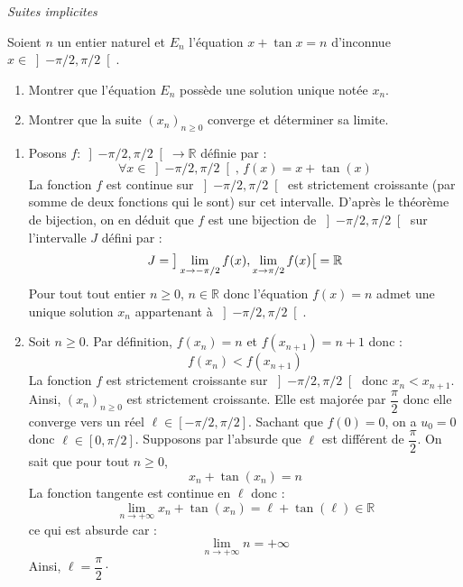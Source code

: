 \documentclass[a4paper,10pt]{report}
\begin{document}
\medskip

\begin{center}
\textit{{ {\large Suites implicites}}}
\end{center}

\medskip

\begin{Exa} Soient $n$ un entier naturel et $E_n $ l'équation $x + \tan x = n$ d'inconnue $x \in \left] { - \pi  / 2,\pi  / 2} \right[$.

\begin{enumerate}
\item Montrer que l'équation $E_n$ possède une solution unique notée $x_n$.
\item Montrer que la suite $(x_n)_{n \geq 0}$ converge et déterminer sa limite.
\end{enumerate}
\end{Exa} 

\newpage

\corr 

\begin{enumerate}
\item Posons $f : \left] { - \pi  / 2,\pi  / 2} \right[ \rightarrow \mathbb{R}$ définie par :
$$ \forall x \in \left] { - \pi  / 2,\pi  / 2} \right[, \, f(x) = x+ \tan(x)$$
La fonction $f$ est continue sur $\left] { - \pi  / 2,\pi  / 2} \right[$ est strictement croissante (par somme de deux fonctions qui le sont) sur cet intervalle. D'après le théorème de bijection, on en déduit que $f$ est une bijection de $\left] { - \pi  / 2,\pi  / 2} \right[$ sur l'intervalle $J$ défini par :
$$ J = \big{]} \lim_{x \rightarrow - \pi/2} f(x), \lim_{x \rightarrow \pi/2} f(x) \big{[} = \mathbb{R}$$
Pour tout tout entier $n \geq 0$, $n \in \mathbb{R}$ donc l'équation $f(x)=n$ admet une unique solution $x_n$ appartenant à $\left] { - \pi  / 2,\pi  / 2} \right[$.
\item Soit $n \geq 0$. Par définition, $f(x_n) =n$ et $f(x_{n+1})=n+1$ donc :
$$ f(x_n) < f(x_{n+1})$$
La fonction $f$ est strictement croissante sur $\left] { - \pi  / 2,\pi  / 2} \right[$ donc $x_n < x_{n+1}$. Ainsi, $(x_n)_{n \geq 0}$ est strictement croissante. Elle est majorée par $\dfrac{\pi}{2}$ donc elle converge vers un réel $\ell \in \left[ { - \pi  / 2,\pi  / 2} \right]$. Sachant que $f(0)=0$, on a $u_0=0$ donc $\ell \in \left[ {0,\pi  / 2} \right]$. Supposons par l'absurde que $\ell$ est différent de $\dfrac{\pi}{2}$. On sait que pour tout $n \geq 0$,
$$ x_n + \tan(x_n) = n$$
La fonction tangente est continue en $\ell$ donc :
$$ \lim_{n \rightarrow + \infty} x_n + \tan(x_n) = \ell + \tan(\ell) \in \mathbb{R}$$
ce qui est absurde car :
$$ \lim_{n \rightarrow + \infty} n = + \infty$$
Ainsi, $\ell = \dfrac{\pi}{2}\cdot$
\end{enumerate}
\end{document}

